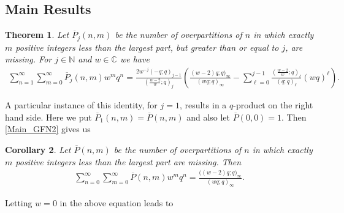 \documentclass[12pt,reqno]{amsart}
\renewcommand{\(}{\left\(}
\renewcommand{\)}{\right\)}
\renewcommand{\[}{\left\[}
\renewcommand{\]}{\right\]}
\numberwithin{equation}{section}
\theoremstyle{plain}
\newtheorem{theorem}{Theorem}[section]
\newtheorem{corollary}[theorem]{Corollary}
\begin{document}
\subsection{Main Results}
\begin{theorem} \label{OP_j(n,m)GFN}
Let $\overline{P}_j(n,m)$ be the number of overpartitions of $n$ in which exactly $m$ positive integers less than the largest part, but greater than or equal to $j$, are missing. For $j\in \mathbb{N}$ and $w\in \mathbb{C}$ we have
 \begin{align}
\sum_{n=1}^{\infty}\sum_{m=0}^{\infty} \overline{P}_j(n,m)w^mq^n=\frac{2w^{-j}(-q;q)_{j-1}}{(\frac{w-2}{w};q)_j}\left(\frac{(w-2)q;q)_{\infty}}{(wq;q)_{\infty}}-\sum_{\ell=0}^{j-1}\frac{(\frac{w-2}{w};q)_{\ell}}{(q;q)_\ell}(wq)^\ell\right).\label{Main_GFN2}
\end{align}   
\end{theorem}
A particular instance of this identity, for $j=1$, results in a $q$-product on the right hand side. Here we put $\overline{P}_1(n,m)=\overline{P}(n,m)$ and also let $\overline{P}(0,0)=1$. Then \eqref{Main_GFN2} gives us
\begin{corollary}\label{Corollary 3.2}
Let $\overline{P}(n,m)$ be the number of overpartitions of $n$ in which exactly $m$ positive integers less than the largest part are missing. Then
\begin{align}
\sum_{n=0}^{\infty}\sum_{m=0}^{\infty} \overline{P}(n,m)w^mq^n=\frac{\big((w-2)q;q\big)_{\infty}}{(wq;q)_{\infty}}.\label{W_GFN_OP}
\end{align}
\end{corollary}

Letting $w=0$ in the above equation leads to
\end{document}
